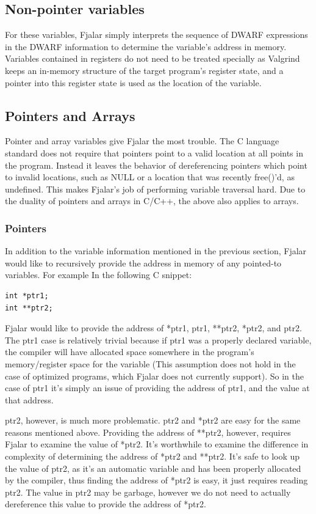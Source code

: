 \documentclass{article}
\begin{document}
\subsection{Non-pointer variables}
For these variables, Fjalar simply interprets the sequence of DWARF
expressions in the DWARF information to determine the variable's
address in memory. Variables contained in registers do not need to be treated
specially as Valgrind keeps an in-memory structure of the target
program's register state, and a pointer into this register state is
used as the location of the variable.

\subsection{Pointers and Arrays}
Pointer and array variables give Fjalar the most trouble. The C
language standard does not require that pointers point to a valid
location at all points in the program. Instead it leaves the behavior
of dereferencing pointers which point to invalid locations, such as
NULL or a location that was recently free()'d, as
undefined. This makes Fjalar's job of performing variable traversal
hard. Due to the duality of pointers and arrays in C/C++, the above
also applies to arrays.

\subsubsection{Pointers}
In addition to the variable information mentioned in the previous
section, Fjalar would like to recursively provide the
address in memory of any pointed-to variables. For example In the
following C snippet:

\lstset{language=C, frame=single,}
\begin{lstlisting}
int *ptr1;
int **ptr2;
\end{lstlisting}

Fjalar would like to provide the address of *ptr1, ptr1, **ptr2,
*ptr2, and ptr2. The ptr1 case is relatively trivial because if ptr1
was a properly declared variable, the compiler will have allocated
space somewhere in the program's memory/register space for the
variable (This assumption does not hold in the case of optimized
programs, which Fjalar does not currently support). So in the case of
ptr1 it's simply an issue of providing the address of ptr1, and the
value at that address.

ptr2, however, is much more problematic. ptr2 and *ptr2 are easy for
the same reasons mentioned above. Providing the address of **ptr2,
however, requires Fjalar to examine the  value of *ptr2.
It's worthwhile to examine the
difference in complexity of determining the address of *ptr2 and
**ptr2. It's safe to look up the value of ptr2, as it's an automatic
variable and has been properly
allocated by the compiler, thus finding the address of *ptr2 is easy,
it just requires reading ptr2. The value
in ptr2 may be garbage, however we do not need to actually
dereference this value to provide the address of *ptr2.
\end{document}
